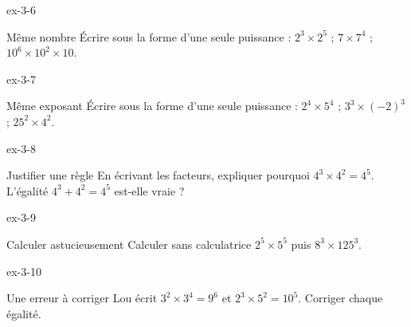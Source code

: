 \begin{blocLivre}{ex-3-6}\begin{exercice}[2]{Même nombre}
Écrire sous la forme d’une seule puissance : $2^3\times2^5$ ; $7\times7^4$ ; $10^6\times10^2\times10$.
\end{exercice}\end{blocLivre}
\begin{blocLivre}{ex-3-7}\begin{exercice}[2]{Même exposant}
Écrire sous la forme d’une seule puissance : $2^4\times5^4$ ; $3^3\times(-2)^3$ ; $25^2\times4^2$.
\end{exercice}\end{blocLivre}
\begin{blocLivre}{ex-3-8}\begin{exercice}[2]{Justifier une règle}
En écrivant les facteurs, expliquer pourquoi $4^3\times4^2=4^5$. L’égalité $4^3+4^2=4^5$ est-elle vraie ?
\end{exercice}\end{blocLivre}
\begin{blocLivre}{ex-3-9}\begin{exercice}[2]{Calculer astucieusement}
Calculer sans calculatrice $2^5\times5^5$ puis $8^3\times125^3$.
\end{exercice}\end{blocLivre}
\begin{blocLivre}{ex-3-10}\begin{exercice}[2]{Une erreur à corriger}
Lou écrit $3^2\times3^4=9^6$ et $2^3\times5^2=10^5$. Corriger chaque égalité.
\end{exercice}\end{blocLivre}


